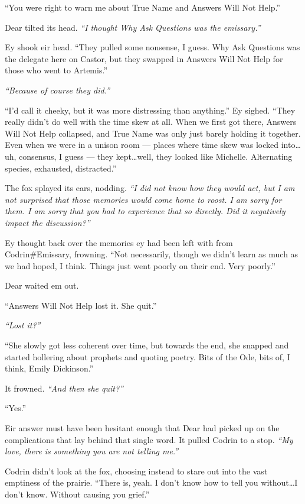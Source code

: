 ``You were right to warn me about True Name and Answers Will Not Help.''

Dear tilted its head. \emph{``I thought Why Ask Questions was the emissary.''}

Ey shook eir head. ``They pulled some nonsense, I guess. Why Ask Questions was the delegate here on Castor, but they swapped in Answers Will Not Help for those who went to Artemis.''

\emph{``Because of course they did.''}

``I'd call it cheeky, but it was more distressing than anything.'' Ey sighed. ``They really didn't do well with the time skew at all. When we first got there, Answers Will Not Help collapsed, and True Name was only just barely holding it together. Even when we were in a unison room — places where time skew was locked into\ldots uh, consensus, I guess — they kept\ldots well, they looked like Michelle. Alternating species, exhausted, distracted.''

The fox splayed its ears, nodding. \emph{``I did not know how they would act, but I am not surprised that those memories would come home to roost. I am sorry for them. I am sorry that you had to experience that so directly. Did it negatively impact the discussion?''}

Ey thought back over the memories ey had been left with from Codrin\#Emissary, frowning. ``Not necessarily, though we didn't learn as much as we had hoped, I think. Things just went poorly on their end. Very poorly.''

Dear waited em out.

``Answers Will Not Help lost it. She quit.''

\emph{``Lost it?''}

``She slowly got less coherent over time, but towards the end, she snapped and started hollering about prophets and quoting poetry. Bits of the Ode, bits of, I think, Emily Dickinson.''

It frowned. \emph{``And then she quit?''}

``Yes.''

Eir answer must have been hesitant enough that Dear had picked up on the complications that lay behind that single word. It pulled Codrin to a stop. \emph{``My love, there is something you are not telling me.''}

Codrin didn't look at the fox, choosing instead to stare out into the vast emptiness of the prairie. ``There is, yeah. I don't know how to tell you without\ldots I don't know. Without causing you grief.''

